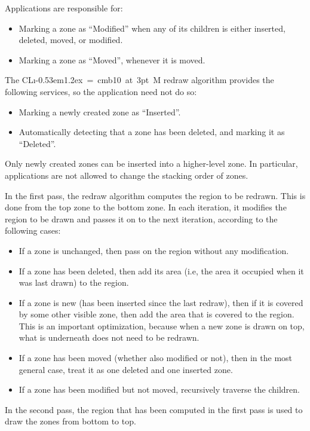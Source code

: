 \documentclass{report}
\def\Tiny{ \font\Tinyfont = cmb10 at 3pt \relax  \Tinyfont}
\def\clim{\textsf{CL{\i}\kern-0.53em\raise1.2ex\hbox{\Tiny 3}M}}
\begin{document}
Applications are responsible for:

\begin{itemize}
\item Marking a zone as ``Modified'' when any of its children is
  either inserted, deleted, moved, or modified.
\item Marking a zone as ``Moved'', whenever it is moved. 
\end{itemize}

The \clim{} redraw algorithm provides the following services, so the
application need not do so:

\begin{itemize}
\item Marking a newly created zone as ``Inserted''. 
\item Automatically detecting that a zone has been deleted, and
  marking it as ``Deleted''. 
\end{itemize}

Only newly created zones can be inserted into a higher-level
zone.  In particular, applications are not allowed to change the
stacking order of zones. 

In the first pass, the redraw algorithm computes the region to be
redrawn.  This is done from the top zone to the bottom zone.  In
each iteration, it modifies the region to be drawn and passes it on to
the next iteration, according to the following cases:

\begin{itemize}
\item If a zone is unchanged, then pass on the region without any
  modification. 
\item If a zone has been deleted, then add its area (i.e, the area
  it occupied when it was last drawn) to the region.
\item If a zone is new (has been inserted since the last redraw),
  then if it is covered by some other visible zone, then add the
  area that is covered to the region.  This is an important
  optimization, because when a new zone is drawn on top, what is
  underneath does not need to be redrawn. 
\item If a zone has been moved (whether also modified or not), then
  in the most general case, treat it as one deleted and one inserted
  zone.
\item If a zone has been modified but not moved, recursively
  traverse the children.
\end{itemize}

In the second pass, the region that has been computed in the first
pass is used to draw the zones from bottom to top.
\end{document}
